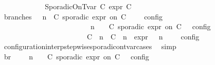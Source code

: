 \begin{isabellebody}
\ \ \ \ \isamarkupfalse%
\isanewline
\ \ \ \ \ \ \isamarkupfalse%
\ {\isacharparenleft}SporadicOnTvar\ C\ {\isasymtau}\isactrlsub e\isactrlsub x\isactrlsub p\isactrlsub r\ C\isanewline
\ \ \ \ \ \ \ \ \isamarkupfalse%
\ branches{\isacharcolon}\ {\isacartoucheopen}{\isasymlbrakk}\ {\isasymGamma}{\isacharcomma}\ n\ {\isasymturnstile}\ {\isacharparenleft}{\isacharparenleft}C\ sporadic{\isasymsharp}\ {\isasymtau}\isactrlsub e\isactrlsub x\isactrlsub p\isactrlsub r\ on\ C\ {\isacharhash}\ {\isasymPsi}{\isacharparenright}\ {\isasymtriangleright}\ {\isasymPhi}\ {\isasymrbrakk}\isactrlsub c\isactrlsub o\isactrlsub n\isactrlsub f\isactrlsub i\isactrlsub g\isanewline
\ \ \ \ \ \ \ \ \ \ \ \ \ \ \ \ \ \ \ \ \ \ {\isacharequal}\ {\isasymlbrakk}\ {\isasymGamma}{\isacharcomma}\ n\ {\isasymturnstile}\ {\isasymPsi}\ {\isasymtriangleright}\ {\isacharparenleft}{\isacharparenleft}C\ sporadic{\isasymsharp}\ {\isasymtau}\isactrlsub e\isactrlsub x\isactrlsub p\isactrlsub r\ on\ C\ {\isacharhash}\ {\isasymPhi}{\isacharparenright}\ {\isasymrbrakk}\isactrlsub c\isactrlsub o\isactrlsub n\isactrlsub f\isactrlsub i\isactrlsub g\isanewline
\ \ \ \ \ \ \ \ \ \ \ \ \ \ \ \ \ \ \ \ \ \ {\isasymunion}\ {\isasymlbrakk}\ {\isacharparenleft}{\isacharparenleft}C\ {\isasymUp}\ n{\isacharparenright}\ {\isacharhash}\ {\isacharparenleft}C\ {\isasymDown}\ n\ {\isacharat}{\isasymsharp}\ {\isasymtau}\isactrlsub e\isactrlsub x\isactrlsub p\isactrlsub r{\isacharparenright}\ {\isacharhash}\ {\isasymGamma}{\isacharparenright}{\isacharcomma}\ n\ {\isasymturnstile}\ {\isasymPsi}\ {\isasymtriangleright}\ {\isasymPhi}\ {\isasymrbrakk}\isactrlsub c\isactrlsub o\isactrlsub n\isactrlsub f\isactrlsub i\isactrlsub g{\isacartoucheclose}\isanewline
\ \ \ \ \ \ \ \ \ \ \isamarkupfalse%
\ configuration{\isacharunderscore}interp{\isacharunderscore}stepwise{\isacharunderscore}sporadicon{\isacharunderscore}tvar{\isacharunderscore}cases\ \isamarkupfalse%
\ simp\isanewline
\ \ \ \ \ \ \ \ \isamarkupfalse%
\ br{}{\isacharcolon}\ {\isacartoucheopen}{\isasymrho}\ {\isasymin}\ {\isasymlbrakk}\ {\isasymGamma}{\isacharcomma}\ n\ {\isasymturnstile}\ {\isasymPsi}\ {\isasymtriangleright}\ {\isacharparenleft}{\isacharparenleft}C\ sporadic{\isasymsharp}\ {\isasymtau}\isactrlsub e\isactrlsub x\isactrlsub p\isactrlsub r\ on\ C\ {\isacharhash}\ {\isasymPhi}{\isacharparenright}\ {\isasymrbrakk}\isactrlsub c\isactrlsub o\isactrlsub n\isactrlsub f\isactrlsub i\isactrlsub g\isanewline

\end{isabellebody}

